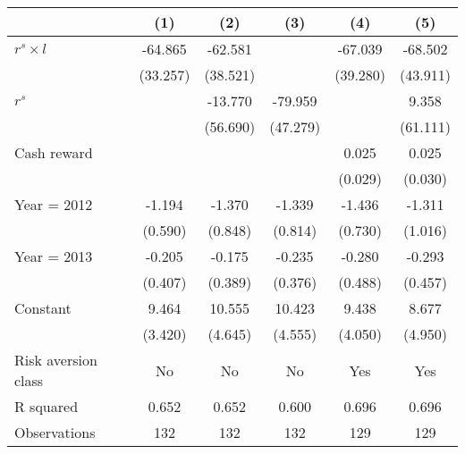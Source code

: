 \begin{tabular}{l*{5}{c}}
\hline\hline
                    &\multicolumn{1}{c}{(1)}&\multicolumn{1}{c}{(2)}&\multicolumn{1}{c}{(3)}&\multicolumn{1}{c}{(4)}&\multicolumn{1}{c}{(5)}\\
\hline
$r^s \times l$      &     -64.865&     -62.581&            &     -67.039&     -68.502\\
                    &    (33.257)&    (38.521)&            &    (39.280)&    (43.911)\\
$r^s$               &            &     -13.770&     -79.959&            &       9.358\\
                    &            &    (56.690)&    (47.279)&            &    (61.111)\\
Cash reward         &            &            &            &       0.025&       0.025\\
                    &            &            &            &     (0.029)&     (0.030)\\
Year = 2012         &      -1.194&      -1.370&      -1.339&      -1.436&      -1.311\\
                    &     (0.590)&     (0.848)&     (0.814)&     (0.730)&     (1.016)\\
Year = 2013         &      -0.205&      -0.175&      -0.235&      -0.280&      -0.293\\
                    &     (0.407)&     (0.389)&     (0.376)&     (0.488)&     (0.457)\\
Constant            &       9.464&      10.555&      10.423&       9.438&       8.677\\
                    &     (3.420)&     (4.645)&     (4.555)&     (4.050)&     (4.950)\\
\hline
Risk aversion class &          No&          No&          No&         Yes&         Yes\\
R squared           &       0.652&       0.652&       0.600&       0.696&       0.696\\
Observations        &         132&         132&         132&         129&         129\\
\hline\hline
\end{tabular}
